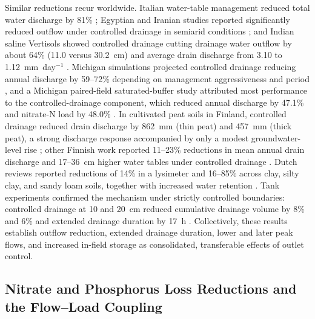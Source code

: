 \documentclass[11pt]{article}
\begin{document}
Similar reductions recur worldwide. Italian water-table management reduced total
water discharge by 81\% \parencite{Tolomio2018}; Egyptian and Iranian studies
reported significantly reduced outflow under controlled drainage in semiarid
conditions \parencite{Wahba2001,Jouni2018}; and Indian saline Vertisols showed
controlled drainage cutting drainage water outflow by about 64\% (11.0 versus
30.2~cm) and average drain discharge from 3.10 to 1.12~mm~day$^{-1}$
\parencite{Karegoudar2019}. Michigan simulations projected controlled drainage
reducing annual discharge by 59--72\% depending on management aggressiveness and
period \parencite{BinShokrana2023}, and a Michigan paired-field saturated-buffer
study attributed most performance to the controlled-drainage component, which
reduced annual discharge by 47.1\% and nitrate-N load by 48.0\%
\parencite{Ghane2025}. In cultivated peat soils in Finland, controlled drainage
reduced drain discharge by 862~mm (thin peat) and 457~mm (thick peat), a strong
discharge response accompanied by only a modest groundwater-level rise
\parencite{Tähtikarhu2025}; other Finnish work reported 11--23\% reductions in
mean annual drain discharge and 17--36~cm higher water tables under controlled
drainage \parencite{Salla2022}. Dutch reviews reported reductions of 14\% in a
lysimeter and 16--85\% across clay, silty clay, and sandy loam soils, together
with increased water retention \parencite{deWit2022}. Tank experiments confirmed
the mechanism under strictly controlled boundaries: controlled drainage at 10
and 20~cm reduced cumulative drainage volume by 8\% and 6\% and extended
drainage duration by 17~h \parencite{Zheng2025}. Collectively, these results
establish outflow reduction, extended drainage duration, lower and later peak
flows, and increased in-field storage as consolidated, transferable effects of
outlet control.

\subsection{Nitrate and Phosphorus Loss Reductions and the Flow--Load Coupling}
\end{document}
